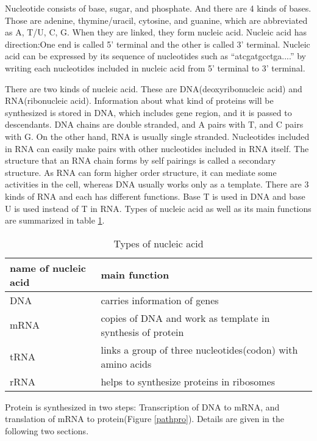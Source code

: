 Nucleotide consists of base, sugar, and phosphate. And there are 4
kinds of bases. Those are adenine, thymine/uracil, cytosine, and
guanine, which are abbreviated as A, T/U, C, G. When they are linked,
they form nucleic acid. Nucleic acid has direction:One end is called
5' terminal and the other is called 3' terminal.  Nucleic acid can be
expressed by its sequence of nucleotides such as ``atcgatgcctga....'' 
by writing each nucleotides included in nucleic acid from 5' terminal
to 3' terminal.

There are two kinds of nucleic acid. These are DNA(deoxyribonucleic
acid) and RNA(ribonucleic acid).  Information about what kind of
proteins will be synthesized is stored in DNA, which includes gene region, and
it is passed to descendants.  DNA chains are double stranded, and A
pairs with T, and C pairs with G. On the other hand, RNA is usually
single stranded.  Nucleotides included in RNA can easily make pairs with
other nucleotides included in RNA itself. The structure that an RNA
chain forms by self pairings is called a secondary structure.  As RNA
can form higher order structure, it can mediate some activities in the
cell, whereas DNA usually works only as a template.  There are 3 kinds
of RNA and each has different functions.  Base T is used in DNA and base
U is used instead of T in RNA.  Types of nucleic acid as well as its
main functions are summarized in table \ref{nuc_type}.

\begin{table}
\begin{center}
\begin{tabular}{|l|l|}
\hline
name of nucleic acid & main function\\
\hline
\hline
DNA & carries information of genes\\
\hline
mRNA & copies of DNA and work as template in synthesis of protein\\
\hline
tRNA & links a group of three nucleotides(codon) with 
amino acids \\
\hline
rRNA & helps to synthesize proteins in ribosomes\\
\hline 
\end{tabular}
\end{center}
\caption{Types of nucleic acid}
\label{nuc_type}  
\end{table}

Protein is synthesized in two steps: Transcription of DNA to mRNA, and
translation of mRNA to protein(Figure \ref{pathpro}). Details are
given in the following two sections.

